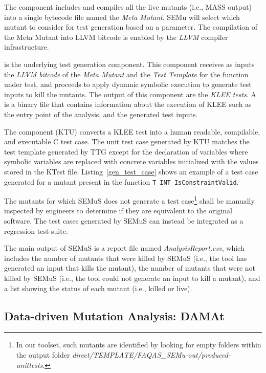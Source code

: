 {

The  component includes and compiles all the live mutants (i.e., MASS output) into a single bytecode file named the \emph{Meta Mutant}. SEMu will select which mutant to consider for test generation based on a parameter. The compilation of the Meta Mutant into LLVM bitcode is enabled by the \emph{LLVM} compiler infrastructure. 

 is the underlying test generation component. This component receives as inputs the \emph{LLVM bitcode} of the \emph{Meta Mutant} and the \emph{Test Template} for the function under test, and proceeds to apply dynamic symbolic execution to generate test inputs to kill the mutants. The output of this component are the \emph{KLEE tests}.
A  is a binary file that contains information about the execution of KLEE such as the entry point of the analysis, and the generated test inputs.


The component  (KTU) converts a KLEE test into a human readable, compilable, and executable C test case. The unit test case generated by KTU matches the test template generated by TTG except for the declaration of variables where symbolic variables are replaced with concrete variables initialized with the values stored in the KTest file.
Listing~\ref{gen_test_case} shows an example of a test case generated for a mutant present in the function \texttt{T\_INT\_Is\-ConstraintValid}. 

The mutants for which SEMuS does not generate a test case\footnote{In our toolset, such mutants are identified by looking for empty folders within the output folder \emph{direct/TEMPLATE/FAQAS\_SEMu-out/produced-unittests}.} shall be manually inspected by engineers to determine if they are equivalent to the original software.
The test cases generated by SEMuS can instead be integrated as a regression test suite.



The main output of SEMuS is a report file named \emph{AnalysisReport.csv}, which includes the number of mutants that were killed by SEMuS (i.e., the tool has generated an input that kills the mutant), the number of mutants that were not killed by SEMuS (i.e., the tool could not generate an input to kill a mutant), and a list showing the status of each mutant (i.e., killed or live).


\subsection{Data-driven Mutation Analysis: DAMAt}



}
